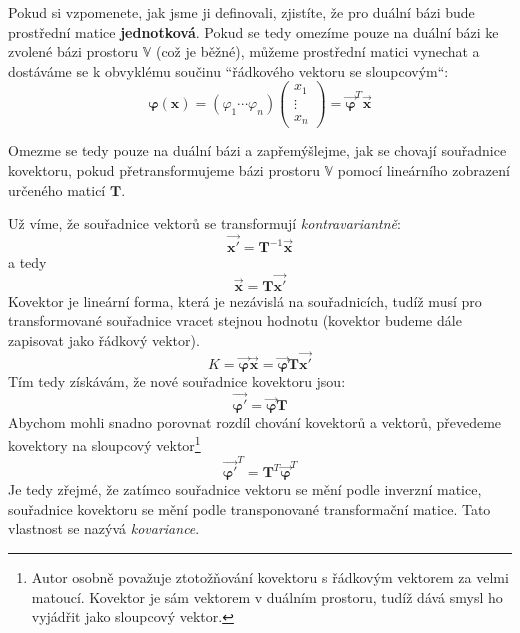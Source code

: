 \documentclass[a5paper,12pt]{amsbook}
\theoremstyle{definition}
\newcommand{\myvec}[1]{\mathbf{#1}}
\newcommand{\mycoord}[1]{\overrightarrow{\mathbf{#1}}}
\newcommand{\mymatrix}[1]{\mathbf{#1}}
\newcommand{\myspace}[1]{\mathbb{#1}}
\begin{document}
Pokud si vzpomenete, jak jsme ji definovali, zjistíte, že pro duální bázi bude
prostřední matice \textbf{jednotková}. Pokud se tedy omezíme pouze na duální
bázi ke zvolené bázi prostoru $\myspace{V}$ (což je běžné), můžeme prostřední
matici vynechat a dostáváme se k obvyklému součinu ``řádkového vektoru se
sloupcovým``:
\begin{equation*}
\myvec{\varphi}(\myvec{x}) = \left(\varphi_1 \cdots \varphi_n\right)
\left(\begin{array}{c}x_1 \\ \vdots \\ x_n\end{array}\right)
= \mycoord{\varphi}^T\mycoord{x}
\end{equation*}

\medskip\noindent
Omezme se tedy pouze na duální bázi a zapřemýšlejme, jak se chovají souřadnice
kovektoru, pokud přetransformujeme bázi prostoru $\myspace{V}$ pomocí lineárního
zobrazení určeného maticí $\mymatrix{T}$.

Už víme, že souřadnice vektorů se transformují \textit{kontravariantně}:
\begin{equation*}
\mycoord{x'} = \mymatrix{T}^{-1}\mycoord{x}
\end{equation*}
a tedy
\begin{equation*}
\mycoord{x} = \mymatrix{T}\mycoord{x'}
\end{equation*}
Kovektor je lineární forma, která je nezávislá na souřadnicích, tudíž musí pro
transformované souřadnice vracet stejnou hodnotu (kovektor budeme dále zapisovat
jako řádkový vektor). 
\begin{equation*}
K = \mycoord{\varphi}\mycoord{x} = \mycoord{\varphi}\mymatrix{T}\mycoord{x'}
\end{equation*}
Tím tedy získávám, že nové souřadnice kovektoru jsou:
\begin{equation*}
\mycoord{\varphi'} = \mycoord{\varphi}\mymatrix{T}
\end{equation*}
Abychom mohli snadno porovnat rozdíl chování kovektorů a vektorů, převedeme kovektory
na sloupcový vektor\footnote{
  Autor osobně považuje ztotožňování kovektoru s řádkovým vektorem za velmi matoucí.
  Kovektor je sám vektorem v duálním prostoru, tudíž dává smysl ho vyjádřit
  jako sloupcový vektor.}
\begin{equation*}
\mycoord{\varphi'}^T = \mymatrix{T}^T\mycoord{\varphi}^T
\end{equation*}
Je tedy zřejmé, že zatímco souřadnice vektoru se mění podle inverzní matice, souřadnice
kovektoru se mění podle transponované transformační matice. Tato vlastnost se nazývá
\textit{kovariance}.
\end{document}
